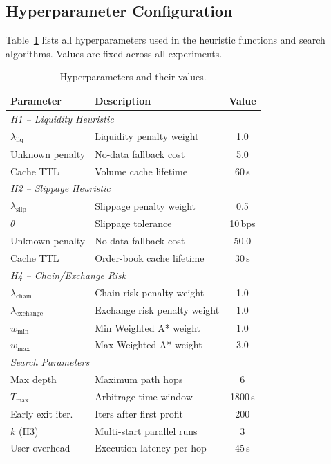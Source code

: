\subsection{Hyperparameter Configuration}
\label{sec:hyperparams}

Table~\ref{tab:hyperparams} lists all hyperparameters used in the heuristic functions and search algorithms. Values are fixed across all experiments.

\begin{table}[h]
\centering
\small
\caption{Hyperparameters and their values.}
\label{tab:hyperparams}
\begin{tabular}{llc}
\toprule
\textbf{Parameter} & \textbf{Description} & \textbf{Value} \\
\midrule
\multicolumn{3}{l}{\textit{H1 -- Liquidity Heuristic}} \\
$\lambda_{\text{liq}}$ & Liquidity penalty weight & 1.0 \\
Unknown penalty & No-data fallback cost & 5.0 \\
Cache TTL & Volume cache lifetime & 60\,s \\
\midrule
\multicolumn{3}{l}{\textit{H2 -- Slippage Heuristic}} \\
$\lambda_{\text{slip}}$ & Slippage penalty weight & 0.5 \\
$\theta$ & Slippage tolerance & 10\,bps \\
Unknown penalty & No-data fallback cost & 50.0 \\
Cache TTL & Order-book cache lifetime & 30\,s \\
\midrule
\multicolumn{3}{l}{\textit{H4 -- Chain/Exchange Risk}} \\
$\lambda_{\text{chain}}$ & Chain risk penalty weight & 1.0 \\
$\lambda_{\text{exchange}}$ & Exchange risk penalty weight & 1.0 \\
$w_{\min}$ & Min Weighted A* weight & 1.0 \\
$w_{\max}$ & Max Weighted A* weight & 3.0 \\
\midrule
\multicolumn{3}{l}{\textit{Search Parameters}} \\
Max depth & Maximum path hops & 6 \\
$T_{\max}$ & Arbitrage time window & 1800\,s \\
Early exit iter. & Iters after first profit & 200 \\
$k$ (H3) & Multi-start parallel runs & 3 \\
User overhead & Execution latency per hop & 45\,s \\
\bottomrule
\end{tabular}
\end{table}

